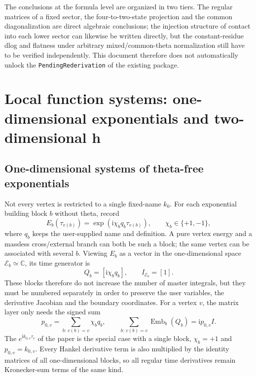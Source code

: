 \documentclass[11pt,a4paper]{article}
\newcommand{\ii}{\mathrm i}
\newcommand{\cE}{\mathcal E}
\newcommand{\Emb}{\operatorname{Emb}}
\begin{document}
The conclusions at the formula level are organized in two tiers. The regular matrices of a fixed sector, the four-to-two-state projection and the common diagonalization are direct algebraic conclusions; the injection structure of contact into each lower sector can likewise be written directly, but the constant-residue dlog and flatness under arbitrary mixed/common-theta normalization still have to be verified independently. This document therefore does not automatically unlock the \texttt{PendingRederivation} of the existing package.

\section{Local function systems: one-dimensional exponentials and two-dimensional h}
\label{sec:local-function-system}

\subsection{One-dimensional systems of theta-free exponentials}

Not every vertex is restricted to a single fixed-name $k_0$. For each exponential building block $b$ without theta, record
\begin{equation}
 E_b(\tau_{v(b)})
 =\exp\!\left(\ii\chi_bq_b\tau_{v(b)}\right),
 \qquad \chi_b\in\{+1,-1\},
 \label{eq:phase-exponent-block}
\end{equation}
where $q_b$ keeps the user-supplied name and definition. A pure vertex energy and a massless cross/external branch can both be such a block; the same vertex can be associated with several $b$. Viewing $E_b$ as a vector in the one-dimensional space $\cE_b\simeq\mathbb C$, its time generator is
\begin{equation}
 Q_b=[\ii\chi_bq_b],
 \qquad I_{\cE_b}=[1].
 \label{eq:exponential-1d}
\end{equation}
These blocks therefore do not increase the number of master integrals, but they must be numbered separately in order to preserve the user variables, the derivative Jacobian and the boundary coordinates. For a vertex $v$, the matrix layer only needs the signed sum
\begin{equation}
 p_{0,v}=\sum_{b:\,v(b)=v}\chi_bq_b,
 \qquad
 \sum_{b:\,v(b)=v}\Emb_b(Q_b)=\ii p_{0,v}I.
 \label{eq:vertex-signed-phase-energy}
\end{equation}
The $e^{\ii k_{0,v}\tau_v}$ of the paper is the special case with a single block, $\chi_b=+1$ and $p_{0,v}=k_{0,v}$. Every Hankel derivative term is also multiplied by the identity matrices of all one-dimensional blocks, so all regular time derivatives remain Kronecker-sum terms of the same kind.
\end{document}
